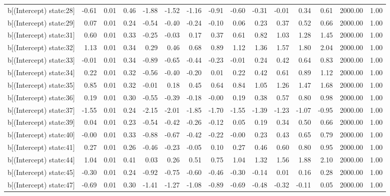 \begin{table}[ht]
\begin{tabular}{rrrrrrrrrrrrrrr}
  b[(Intercept) state:28] & -0.61 & 0.01 & 0.46 & -1.88 & -1.52 & -1.16 & -0.91 & -0.60 & -0.31 & -0.01 & 0.34 & 0.61 & 2000.00 & 1.00 \\ 
  b[(Intercept) state:29] & 0.07 & 0.01 & 0.24 & -0.54 & -0.40 & -0.24 & -0.10 & 0.06 & 0.23 & 0.37 & 0.52 & 0.66 & 2000.00 & 1.00 \\ 
  b[(Intercept) state:31] & 0.60 & 0.01 & 0.33 & -0.25 & -0.03 & 0.17 & 0.37 & 0.61 & 0.82 & 1.03 & 1.28 & 1.45 & 2000.00 & 1.00 \\ 
  b[(Intercept) state:32] & 1.13 & 0.01 & 0.34 & 0.29 & 0.46 & 0.68 & 0.89 & 1.12 & 1.36 & 1.57 & 1.80 & 2.04 & 2000.00 & 1.00 \\ 
  b[(Intercept) state:33] & -0.01 & 0.01 & 0.34 & -0.89 & -0.65 & -0.44 & -0.23 & -0.01 & 0.24 & 0.42 & 0.64 & 0.83 & 2000.00 & 1.00 \\ 
  b[(Intercept) state:34] & 0.22 & 0.01 & 0.32 & -0.56 & -0.40 & -0.20 & 0.01 & 0.22 & 0.42 & 0.61 & 0.89 & 1.12 & 2000.00 & 1.00 \\ 
  b[(Intercept) state:35] & 0.85 & 0.01 & 0.32 & -0.01 & 0.18 & 0.45 & 0.64 & 0.84 & 1.05 & 1.26 & 1.47 & 1.68 & 2000.00 & 1.00 \\ 
  b[(Intercept) state:36] & 0.19 & 0.01 & 0.30 & -0.55 & -0.39 & -0.18 & -0.00 & 0.19 & 0.38 & 0.57 & 0.80 & 0.98 & 2000.00 & 1.00 \\ 
  b[(Intercept) state:37] & -1.55 & 0.01 & 0.24 & -2.15 & -2.01 & -1.85 & -1.70 & -1.55 & -1.39 & -1.23 & -1.07 & -0.95 & 2000.00 & 1.00 \\ 
  b[(Intercept) state:39] & 0.04 & 0.01 & 0.23 & -0.54 & -0.42 & -0.26 & -0.12 & 0.05 & 0.19 & 0.34 & 0.50 & 0.66 & 2000.00 & 1.00 \\ 
  b[(Intercept) state:40] & -0.00 & 0.01 & 0.33 & -0.88 & -0.67 & -0.42 & -0.22 & -0.00 & 0.23 & 0.43 & 0.65 & 0.79 & 2000.00 & 1.00 \\ 
  b[(Intercept) state:41] & 0.27 & 0.01 & 0.26 & -0.46 & -0.23 & -0.05 & 0.10 & 0.27 & 0.46 & 0.60 & 0.80 & 0.95 & 2000.00 & 1.00 \\ 
  b[(Intercept) state:44] & 1.04 & 0.01 & 0.41 & 0.03 & 0.26 & 0.51 & 0.75 & 1.04 & 1.32 & 1.56 & 1.88 & 2.10 & 2000.00 & 1.00 \\ 
  b[(Intercept) state:45] & -0.30 & 0.01 & 0.24 & -0.92 & -0.75 & -0.60 & -0.46 & -0.30 & -0.14 & 0.01 & 0.16 & 0.28 & 2000.00 & 1.00 \\ 
  b[(Intercept) state:47] & -0.69 & 0.01 & 0.30 & -1.41 & -1.27 & -1.08 & -0.89 & -0.69 & -0.48 & -0.32 & -0.11 & 0.05 & 2000.00 & 1.00 \\ 

\end{tabular}
\end{table}
